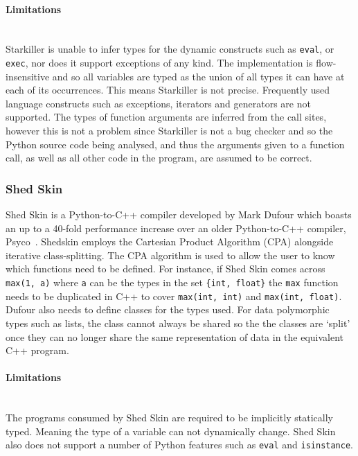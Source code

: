 \documentclass[12pt, titlepage]{article}
\begin{document}
\paragraph*{Limitations}\mbox{}\\
Starkiller is unable to infer types for the dynamic constructs such as \texttt{eval}, or \texttt{exec}, nor does it support exceptions of any kind. The implementation is flow-insensitive and so all variables are typed as the union of all types it can have at each of its occurrences. This means Starkiller is not precise. Frequently used language constructs such as exceptions, iterators and generators are not supported. The types of function arguments are inferred from the call sites, however this is not a problem since Starkiller is not a bug checker and so the Python source code being analysed, and thus the arguments given to a function call, as well as all other code in the program, are assumed to be correct.

\subsubsection{Shed Skin}
Shed Skin is a Python-to-C++ compiler developed by Mark Dufour which boasts an up to a 40-fold performance increase over an older Python-to-C++ compiler, Psyco~\cite{shedskin}. Shedskin employs the Cartesian Product Algorithm (CPA) alongside iterative class-splitting. The CPA algorithm is used to allow the user to know which functions need to be defined. For instance, if Shed Skin comes across \texttt{max(1, a)} where \texttt{a} can be the types in the set \texttt{\{int, float\}} the \texttt{max} function needs to be duplicated in C++ to cover \texttt{max(int, int)} and \texttt{max(int, float)}. Dufour also needs to define classes for the types used. For data polymorphic types such as lists, the class cannot always be shared so the the classes are `split' once they can no longer share the same representation of data in the equivalent C++ program.

\paragraph*{Limitations}\mbox{}\\
The programs consumed by Shed Skin are required to be implicitly statically typed. Meaning the type of a variable can not dynamically change. Shed Skin also does not support a number of Python features such as \texttt{eval} and \texttt{isinstance}.
\end{document}
